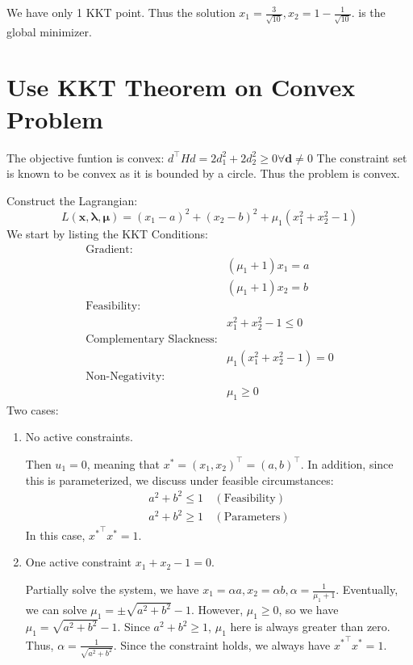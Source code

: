 We have only 1 KKT point. Thus the solution $x_1 = \frac{3}{\sqrt{10}}, x_2 = 1 - \frac{1}{\sqrt{10}}$. is the global minimizer. 


\section{Use KKT Theorem on Convex Problem}

The objective funtion is convex: $d^\intercal H d = 2d_1^2 + 2d_2^2 \geq 0 \forall \mathbf{d} \neq 0$ The constraint set is known to be convex as it is bounded by a circle. Thus the problem is convex.

Construct the Lagrangian:
\[
L(\bm{x, \lambda, \mu}) = (x_1 - a)^2 + (x_2 - b)^2 + \mu_1 (x_1^2 + x_2^2 - 1)
\]
We start by listing the KKT Conditions:
\begin{align*}
\text{Gradient:}&\\
& (\mu_1 + 1)x_1 = a \\
& (\mu_1 + 1)x_2 = b \\
\text{Feasibility:}&\\
&x_1^2 +x_2^2 - 1 \leq 0 \\
\text{Complementary Slackness:}&\\
&\mu_1 (x_1^2 + x_2^2 - 1) = 0 \\
\text{Non-Negativity:}&\\
&\mu_1 \geq 0
\end{align*}
Two cases:
\begin{enumerate}
\item No active constraints.
\par Then $u_1 = 0$, meaning that $x^* = (x_1, x_2)^\intercal = (a, b)^\intercal$. In addition, since this is parameterized, we discuss under feasible circumstances:
\begin{align*}
    a^2 + b^2 \leq 1 & \,(\text{Feasibility})\\
    a^2 + b^2 \geq 1 & \,(\text{Parameters})
\end{align*}
In this case, ${x^*}^\intercal x^* = 1$.

\item One active constraint $x_1 + x_2 - 1 = 0$. 
\par Partially solve the system, we have $x_1 = \alpha a, x_2 = \alpha b, \alpha = \frac{1}{\mu_1 + 1}$. Eventually, we can solve $\mu_1 = \pm \sqrt{a^2 + b^2} - 1$. However, $\mu_1 \geq 0$, so we have $\mu_1 = \sqrt{a^2 + b^2} - 1$. Since $a^2 + b^2 \geq 1$, $\mu_1$ here is always greater than zero. Thus, $\alpha = \frac{1}{\sqrt{a^2 + b^2}}$. Since the constraint holds, we always have ${x^*}^\intercal x^* = 1$.
\end{enumerate}

